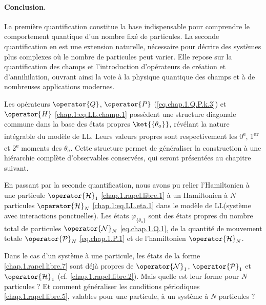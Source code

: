 \paragraph*{Conclusion.}

La première quantification constitue la base indispensable pour comprendre le comportement quantique d’un nombre fixé de particules. La seconde quantification en est une extension naturelle, nécessaire pour décrire des systèmes plus complexes où le nombre de particules peut varier. Elle repose sur la quantification des champs et l’introduction d’opérateurs de création et d’annihilation, ouvrant ainsi la voie à la physique quantique des champs et à de nombreuses applications modernes.

\medskip

Les opérateurs $\operator{Q}$, $\operator{P}$ (\eqref{eq.chap.1.Q.P.k.3}) et $\operator{H}$ \eqref{chap.1:eq.LL.champ.1} possèdent une structure diagonale commune dans la base des états propres $\ket{\{\theta_a\}}$, révélant la nature intégrable du modèle de \gls{LL}. Leurs valeurs propres sont respectivement les 0\textsuperscript{e}, 1\textsuperscript{er} et 2\textsuperscript{e} moments des $\theta_a$. Cette structure permet de généraliser la construction à une hiérarchie complète d’observables conservées, qui seront présentées au chapitre suivant.

\medskip

En passant par la seconde quantification, nous avons pu relier l’Hamiltonien à une particule $\operator{\mathcal{H}}_1$ \eqref{chap.1.rapel.libre.1} à un Hamiltonien à $N$ particules $\operator{\mathcal{H}}_N$ \eqref{chap.1:eq.LL.eta.1} dans le modèle de \gls{LL}(système avec interactions ponctuelles). Les états $\varphi_{\{ \theta_a \}}$ sont des états propres du nombre total de particules $\operator{\mathcal{N}}_N$ \eqref{eq.chap.1.Q.1}, de la quantité de mouvement totale $\operator{\mathcal{P}}_N$ \eqref{eq.chap.1.P.1} et de l’hamiltonien $\operator{\mathcal{H}}_N$.

\medskip

Dans le cas d’un système à une particule, les états de la forme \eqref{chap.1.rapel.libre.7} sont déjà propres de $\operator{\mathcal{N}}_1$, $\operator{\mathcal{P}}_1$ et $\operator{\mathcal{H}}_1$ (cf. \eqref{chap.1.rapel.libre.2}). Mais quelle est leur forme pour $N$ particules ? Et comment généraliser les conditions périodiques \eqref{chap.1.rapel.libre.5}, valables pour une particule, à un système à $N$ particules ?\\

